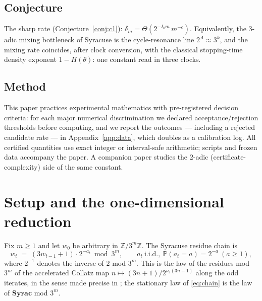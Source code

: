 \documentclass[11pt]{article}
\theoremstyle{definition}
\newcommand{\Z}{\mathbb{Z}}
\newcommand{\Prob}{\mathbb{P}}
\begin{document}
\subsection*{Conjecture} The sharp rate
(Conjecture~\ref{conj:c1}): $\delta_m=\Theta(2^{-I_0m}\,m^{-c})$.
Equivalently, the $3$-adic mixing bottleneck of Syracuse is the
cycle-resonance line $2^{A}\approx 3^{k}$, and the mixing rate coincides,
after clock conversion, with the classical stopping-time density exponent
$1-H(\theta)$: one constant read in three clocks.

\subsection*{Method} This paper practices experimental mathematics with
pre-registered decision criteria: for each major numerical discrimination
we declared acceptance/rejection thresholds before computing, and we
report the outcomes --- including a rejected candidate rate --- in
Appendix~\ref{app:data}, which doubles as a calibration log. All certified
quantities use exact integer or interval-safe arithmetic; scripts and
frozen data accompany the paper. A companion paper \cite{P1} studies the
$2$-adic (certificate-complexity) side of the same constant.

\section{Setup and the one-dimensional reduction}\label{sec:onedim}

Fix $m\ge 1$ and let $w_0$ be arbitrary in $\Z/3^m\Z$. The Syracuse
residue chain is
\begin{equation}\label{eq:chain}
w_t\;=\;(3w_{t-1}+1)\cdot 2^{-a_t} \bmod 3^m,\qquad
a_t\ \text{i.i.d.},\ \Prob(a_t=a)=2^{-a}\ (a\ge 1),
\end{equation}
where $2^{-1}$ denotes the inverse of $2$ mod $3^m$. This is the law of
the residues mod $3^m$ of the accelerated Collatz map
$n\mapsto (3n+1)/2^{\nu_2(3n+1)}$ along the odd iterates, in the sense
made precise in \cite[\S1]{Tao2022}; the stationary law of
\eqref{eq:chain} is the law of $\mathbf{Syrac}$ mod $3^m$.
\end{document}
